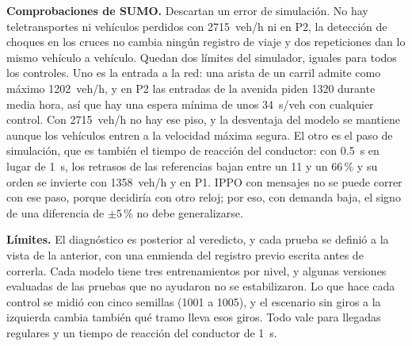 \textbf{Comprobaciones de SUMO.} Descartan un error de simulación. No hay
teletransportes ni vehículos perdidos con 2715~veh/h ni en P2, la
detección de choques en los cruces no cambia ningún registro de viaje y
dos repeticiones dan lo mismo vehículo a vehículo. Quedan dos límites
del simulador, iguales para todos los controles. Uno es la entrada a la
red: una arista de un carril admite como máximo 1202~veh/h, y en P2 las
entradas de la avenida piden 1320 durante media hora, así que hay una
espera mínima de unos 34~s/veh con cualquier control. Con 2715~veh/h no
hay ese piso, y la desventaja del modelo se mantiene aunque los
vehículos entren a la velocidad máxima segura. El otro es el paso de
simulación, que es también el tiempo de reacción del conductor: con
0.5~s en lugar de 1~s, los retrasos de las referencias bajan entre un 11
y un 66\,\% y su orden se invierte con 1358~veh/h y en P1. IPPO con
mensajes no se puede correr con ese paso, porque decidiría con otro
reloj; por eso, con demanda baja, el signo de una diferencia de
$\pm 5$\,\% no debe generalizarse.

\textbf{Límites.} El diagnóstico es posterior al veredicto, y cada
prueba se definió a la vista de la anterior, con una enmienda del
registro previo escrita antes de correrla. Cada modelo tiene tres
entrenamientos por nivel, y algunas versiones evaluadas de las pruebas
que no ayudaron no se estabilizaron. Lo que hace cada control se midió
con cinco semillas (1001 a 1005), y el escenario sin giros a la
izquierda cambia también qué tramo lleva esos giros. Todo vale para
llegadas regulares y un tiempo de reacción del conductor de 1~s.
